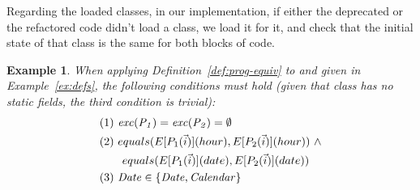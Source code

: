 \documentclass[10pt,conference]{IEEEtran}
\newtheorem{example}{Example}
\begin{document}

Regarding the loaded classes, in our implementation, if either the deprecated or the refactored code didn't load a class, we load it for it,
and check that the initial state of that class is the same for both blocks of code.




\begin{example}\label{ex:equiv}
  When applying Definition~\ref{def:prog-equiv} to  and  given in Example~\ref{ex:defs},
  the following conditions must hold (given that class  has no static fields, the third condition is trivial):
\[
\begin{aligned}
      & (1)~ \var{exc(P_1)}=\var{exc(P_2)} =\emptyset\\
      & (2)~ equals(E[P_1(\vec{i})](hour), E[P_2(\vec{i})](hour)) ~ \wedge\\ %
      & \qquad equals(E[P_1(\vec{i})](date), E[P_2(\vec{i})](date))\\
& (3)~  \var{Date} \in \{\var{Date}, \var{Calendar}\}
    \end{aligned}
    \]

 
    
\end{example}
\end{document}
